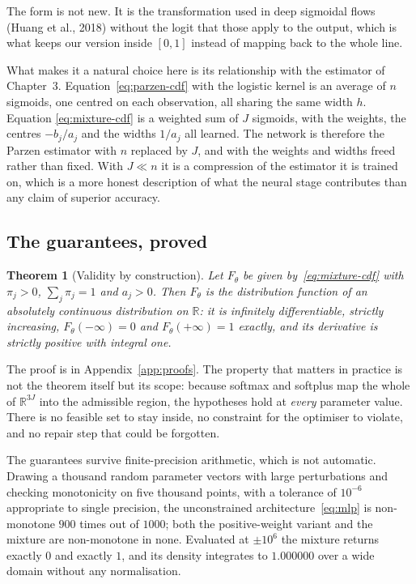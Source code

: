 \documentclass[11pt]{article}
\newtheorem{theorem}{Theorem}
\begin{document}
The form is not new. It is the transformation used in deep sigmoidal flows (Huang et al.,
2018) without the logit that those apply to the output, which is what keeps our version
inside $[0,1]$ instead of mapping back to the whole line.

What makes it a natural choice here is its relationship with the estimator of
Chapter~3. Equation~\eqref{eq:parzen-cdf} with the logistic kernel is an average of $n$
sigmoids, one centred on each observation, all sharing the same width $h$. Equation
\eqref{eq:mixture-cdf} is a weighted sum of $J$ sigmoids, with the weights, the centres
$-b_j/a_j$ and the widths $1/a_j$ all learned. The network is therefore the Parzen estimator
with $n$ replaced by $J$, and with the weights and widths freed rather than fixed. With $J
\ll n$ it is a compression of the estimator it is trained on, which is a more honest
description of what the neural stage contributes than any claim of superior accuracy.

\subsection{The guarantees, proved}

\begin{theorem}[Validity by construction]
\label{thm:validity}
Let $F_\theta$ be given by~\eqref{eq:mixture-cdf} with $\pi_j > 0$, $\sum_j \pi_j = 1$ and
$a_j > 0$. Then $F_\theta$ is the distribution function of an absolutely continuous
distribution on $\mathbb{R}$: it is infinitely differentiable, strictly increasing,
$F_\theta(-\infty) = 0$ and $F_\theta(+\infty) = 1$ exactly, and its derivative is strictly
positive with integral one.
\end{theorem}

The proof is in Appendix~\ref{app:proofs}. The property that matters in practice is not the
theorem itself but its scope: because softmax and softplus map the whole of $\mathbb{R}^{3J}$
into the admissible region, the hypotheses hold at \emph{every} parameter value. There is no
feasible set to stay inside, no constraint for the optimiser to violate, and no repair step
that could be forgotten.

The guarantees survive finite-precision arithmetic, which is not automatic. Drawing a
thousand random parameter vectors with large perturbations and checking monotonicity on five
thousand points, with a tolerance of $10^{-6}$ appropriate to single precision, the
unconstrained architecture~\eqref{eq:mlp} is non-monotone $900$ times out of $1000$; both the
positive-weight variant and the mixture are non-monotone in none. Evaluated at $\pm 10^{6}$
the mixture returns exactly $0$ and exactly $1$, and its density integrates to $1.000000$
over a wide domain without any normalisation.
\end{document}
